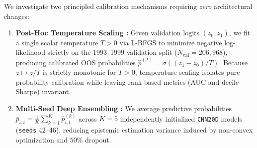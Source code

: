 \documentclass[10pt]{article}
\begin{document}
We investigate two principled calibration mechanisms requiring \emph{zero} architectural changes:
\begin{enumerate}[leftmargin=1.6em,itemsep=1.5pt,topsep=2pt]
  \item \textbf{Post-Hoc Temperature Scaling \cite{guo2017calibration}:} Given validation logits $(z_{0}, z_{1})$, we fit a single scalar temperature $T > 0$ via L-BFGS to minimize negative log-likelihood strictly on the 1993--1999 validation split ($N_{\text{val}} = 206,968$), producing calibrated OOS probabilities $\hat{p}^{(T)} = \sigma((z_1 - z_0)/T)$. Because $z \mapsto z/T$ is strictly monotonic for $T > 0$, temperature scaling isolates pure probability calibration while leaving rank-based metrics (AUC and decile Sharpe) invariant.
  \item \textbf{Multi-Seed Deep Ensembling \cite{lakshminarayanan2017simple}:} We average predictive probabilities $\bar{p}_{i,t} = \frac{1}{K}\sum_{k=1}^K \hat{p}^{(k)}_{i,t}$ across $K = 5$ independently initialized \texttt{CNN20D} models (\texttt{seeds} $42\text{--}46$), reducing epistemic estimation variance induced by non-convex optimization and $50\%$ dropout.
\end{enumerate}

\begin{table}[t]
  \centering
  \caption{\textbf{RQ3 Calibration Summary on 2000--2019 OOS Test Set ($N = 1,491,887$).} Scalar temperatures $T$ are estimated strictly on the 1993--1999 validation split without touching OOS data.}
  \label{tab:sq3}
  \vspace{2pt}
  \vspace{-4pt}
\end{table}
\end{document}
